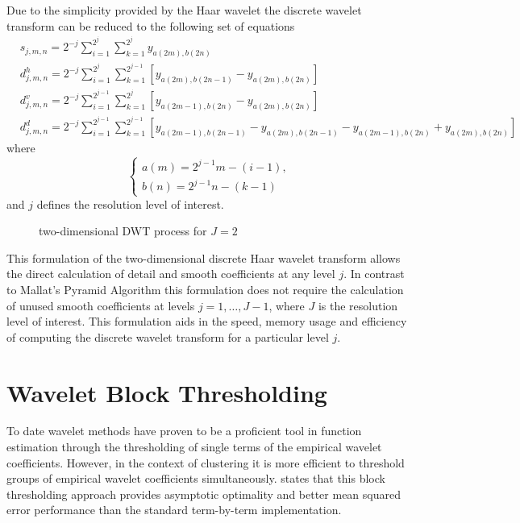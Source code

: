 \documentclass[a4paper, 12pt]{article}
\begin{document}
\medskip
Due to the simplicity provided by the Haar wavelet the discrete wavelet transform can be reduced to the following set of equations
\begin{align*}
& s_{j,m,n} = 2^{-j} \sum\limits^{2^j}_{i = 1} \sum\limits^{2^j}_{k = 1} y_{a(2m), b(2n)} \\
& d^{h}_{j,m,n} = 2^{-j} \sum\limits^{2^j}_{i = 1} \sum\limits^{2^{j-1}}_{k = 1} [y_{a(2m), b(2n-1)} - y_{a(2m), b(2n)}]\\
& d^{v}_{j,m,n} = 2^{-j} \sum\limits^{2^{j-1}}_{i = 1} \sum\limits^{2^{j}}_{k = 1} [y_{a(2m-1), b(2n)} - y_{a(2m), b(2n)}]\\
& d^{d}_{j,m,n} = 2^{-j} \sum\limits^{2^{j-1}}_{i = 1} \sum\limits^{2^{j-1}}_{k = 1} [y_{a(2m - 1), b(2n - 1)} - y_{a(2m),b(2n-1)} - y_{a(2m - 1), b(2n)} + y_{a(2m), b(2n)}] 
\end{align*}
where 
\begin{equation*}
  \begin{cases}
    a(m) = 2^{j-1} m - (i -1),\\
    b(n) = 2^{j-1} n - (k - 1)
  \end{cases}
\end{equation*}
and $j$ defines the resolution level of interest.

\begin{figure}[ht]
    \centering
    \def\svgwidth{\columnwidth}
    
    \caption{two-dimensional DWT process for $J=2$}
    \label{fig:DWT_Process}
\end{figure}

\medskip
This formulation of the two-dimensional discrete Haar wavelet transform allows the direct calculation of detail and smooth coefficients at any level $j$. In contrast to Mallat's Pyramid Algorithm this formulation does not require the calculation of unused smooth coefficients at levels $j = {1, \ldots, J-1}$, where $J$ is the resolution level of interest. This formulation aids in the speed, memory usage and efficiency of computing the discrete wavelet transform for a particular level $j$.

\clearpage
\section{Wavelet Block Thresholding}
To date wavelet methods have proven to be a proficient tool in function estimation through the thresholding of single terms of the empirical wavelet coefficients. However, in the context of clustering it is more efficient to threshold groups of empirical wavelet coefficients simultaneously. \cite{abramovich2002} states that this block thresholding approach provides asymptotic optimality and better mean squared error performance than the standard term-by-term implementation.
\end{document}

